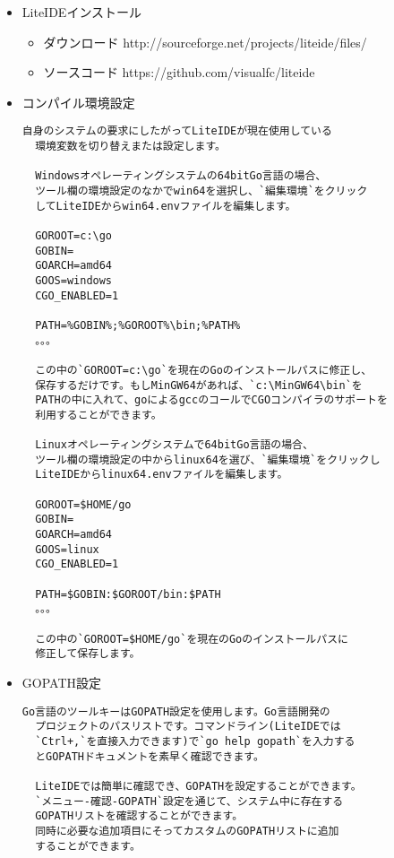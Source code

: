 \begin{itemize}
  \item LiteIDEインストール
    \begin{itemize}
    \item ダウンロード http:\//\//sourceforge.net\//projects\//liteide\//files\//
    \item ソースコード https:\//\//github.com\//visualfc\//liteide
    \end{itemize}
  \item コンパイル環境設定
\begin{lstlisting}[numbers=none]
  自身のシステムの要求にしたがってLiteIDEが現在使用している
  環境変数を切り替えまたは設定します。

  Windowsオペレーティングシステムの64bitGo言語の場合、
  ツール欄の環境設定のなかでwin64を選択し、`編集環境`をクリック
  してLiteIDEからwin64.envファイルを編集します。

  GOROOT=c:\go
  GOBIN=
  GOARCH=amd64
  GOOS=windows
  CGO_ENABLED=1

  PATH=%GOBIN%;%GOROOT%\bin;%PATH%
  。。。

  この中の`GOROOT=c:\go`を現在のGoのインストールパスに修正し、
  保存するだけです。もしMinGW64があれば、`c:\MinGW64\bin`を
  PATHの中に入れて、goによるgccのコールでCGOコンパイラのサポートを
  利用することができます。

  Linuxオペレーティングシステムで64bitGo言語の場合、
  ツール欄の環境設定の中からlinux64を選び、`編集環境`をクリックし
  LiteIDEからlinux64.envファイルを編集します。

  GOROOT=$HOME/go
  GOBIN=
  GOARCH=amd64
  GOOS=linux
  CGO_ENABLED=1

  PATH=$GOBIN:$GOROOT/bin:$PATH    
  。。。

  この中の`GOROOT=$HOME/go`を現在のGoのインストールパスに
  修正して保存します。
\end{lstlisting}
  \item GOPATH設定
\begin{lstlisting}[numbers=none]
  Go言語のツールキーはGOPATH設定を使用します。Go言語開発の
  プロジェクトのパスリストです。コマンドライン(LiteIDEでは
  `Ctrl+,`を直接入力できます)で`go help gopath`を入力する
  とGOPATHドキュメントを素早く確認できます。

  LiteIDEでは簡単に確認でき、GOPATHを設定することができます。
  `メニュー-確認-GOPATH`設定を通じて、システム中に存在する
  GOPATHリストを確認することができます。
  同時に必要な追加項目にそってカスタムのGOPATHリストに追加
  することができます。
\end{lstlisting}
\end{itemize}
